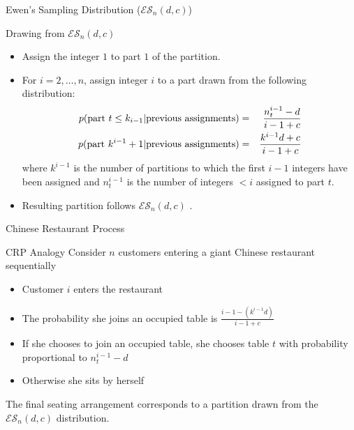 \documentclass{beamer}
\newcommand{\ES}{\mathcal{E}\mathcal{S}}
\begin{document}
\begin{frame}[t]{Ewen's Sampling Distribution ($\ES_n(d,c)$)}

	\begin{block}{Drawing from $\ES_n(d,c)$}
		\begin{itemize}
			\item Assign the integer $1$ to part $1$ of the partition.
			\item {For $i = 2, \ldots, n$, assign integer $i$ to a part drawn from the following distribution: \\
				\vspace{-.65cm}
				\begin{eqnarray*}
					p({\rm part~}t \leq k_{i-1}  | {\rm previous~assignments}) &=& \frac{n^{i-1}_t - d}{i-1 + c}\\
					p({\rm  part~} k^{i-1} + 1 | {\rm previous~ assignments}) &=& \frac{k^{i-1}d + c}{i-1 + c}\\
				\end{eqnarray*}
				\noindent where $k^{i-1}$ is the number of partitions to which the first $i-1$ integers have been assigned and $n^{i-1}_t$ is the number of integers $< i$ assigned to part $t$.
			}
			\item{Resulting partition follows $\ES_n(d,c)$  \cite{Pitman1995}}.
		\end{itemize}
	\end{block}
	
\end{frame}

\begin{frame}[t]{Chinese Restaurant Process}
	
	\begin{block}{CRP Analogy}
			Consider $n$ customers entering a giant Chinese restaurant sequentially
			\vspace{.25cm}
		\begin{itemize}
			\item Customer $i$ enters the restaurant
			\item The probability she joins an occupied table is $\frac{i-1 - (k^{i-1}d)}{i-1+c}$
			\item If she chooses to join an occupied table, she chooses table $t$ with probability proportional to $n_t^{i-1} - d$
			\item Otherwise she sits by herself
		\end{itemize}
			\vspace{.25cm}		
		The final seating arrangement corresponds to a partition drawn from the $\ES_n(d,c)$ distribution.
	\end{block}
	
\end{frame}
\end{document}
